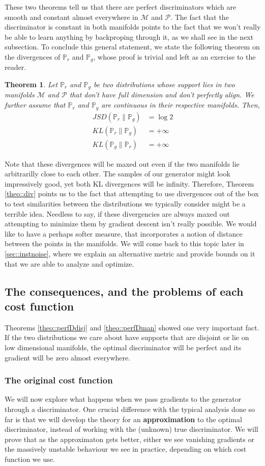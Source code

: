 \documentclass{article} %
\newcommand\manP{\mathcal{P}}
\newcommand\manM{\mathcal{M}}
\newcommand\PP{\mathbb{P}}
\newtheorem{theo}{Theorem}[section]
\theoremstyle{definition}
\begin{document}
These two theorems tell us that there are perfect discriminators which are smooth and
constant almost everywhere in $\manM$ and $\manP$. The fact that the discriminator
is constant in both manifolds points to the fact that we won't really be able to learn
anything by backproping through it, as we shall see in the next subsection. To conclude
this general statement, we state the following theorem on the divergences of $\PP_r$
and $\PP_g$, whose proof is trivial and left as an exercise to the reader.
\begin{theo} \label{theo::div}
Let $\PP_r$ and $\PP_g$ be two distributions whose support lies in two manifolds
$\manM$ and $\manP$ that don't have full dimension and don't perfectly align. We
further assume that $\PP_r$ and $\PP_g$ are continuous in their respective manifolds.
Then,
\begin{align*}
  JSD(\PP_r \| \PP_g) &= \log 2 \\
  KL(\PP_r \| \PP_g) &= +\infty \\
  KL(\PP_g \| \PP_r) &= +\infty
\end{align*}
\end{theo}
Note that these divergences will be maxed out even if the two manifolds lie arbitrarilly
close to each other. The samples of our generator might look impressively good, yet
both KL divergences will be infinity. Therefore, Theorem \autoref{theo::div} points
us to the fact that attempting to use divergences out of the box to test similarities between the distributions
we typically consider might be a terrible idea. Needless to say, if these divergencies
are always maxed out attempting to minimize them by gradient descent isn't really
possible. We would like to have a perhaps softer
measure, that incorporates a notion of distance between the points in the manifolds.
We will come back to this topic later in \autoref{sec::instnoise}, where we
explain an alternative metric and provide bounds on it that we are able to
analyze and optimize.
\subsection{The consequences, and the problems of each cost function}
Theorems \autoref{theo::perfDdisj} and \autoref{theo::perfDman}
showed one very important fact. If the two distributions we care about have
supports that are disjoint or lie on low dimensional manifolds,
the optimal discriminator will be perfect and its gradient will be zero almost everywhere.

\subsubsection{The original cost function}
We will now explore what happens when we pass gradients to the generator through a discriminator.
One crucial difference with the typical analysis done so far is that we will 
develop the theory for an
\textbf{approximation} to the optimal discriminator, instead of working with the (unknown) true
discriminator. We will prove that as the approximaton gets better, either we see vanishing gradients
or the massively unstable behaviour we see in practice, depending on which cost function we use.
\end{document}
